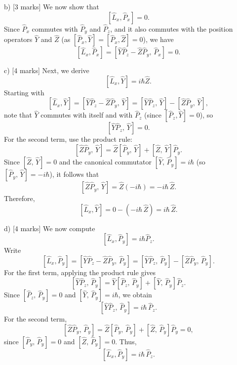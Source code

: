 \documentclass{article}
\begin{document}
b) [3 marks] 
We now show that
\[
\left[\hat{L}_x, \hat{P}_x\right] = 0.
\]
Since \(\hat{P}_x\) commutes with \(\hat{P}_y\) and \(\hat{P}_z\), and it also commutes with the position operators \(\hat{Y}\) and \(\hat{Z}\) (as \([\hat{P}_x, \hat{Y}] = [\hat{P}_x, \hat{Z}] = 0\)), we have
\[
\left[\hat{L}_x, \hat{P}_x\right] = \left[\hat{Y}\hat{P}_z - \hat{Z}\hat{P}_y,\, \hat{P}_x\right] = 0.
\]

c) [4 marks]
Next, we derive
\[
\left[\hat{L}_x, \hat{Y}\right] = i\hbar \hat{Z}.
\]
Starting with
\[
\left[\hat{L}_x, \hat{Y}\right] = \left[\hat{Y}\hat{P}_z - \hat{Z}\hat{P}_y,\, \hat{Y}\right] 
= \left[\hat{Y}\hat{P}_z,\, \hat{Y}\right] - \left[\hat{Z}\hat{P}_y,\, \hat{Y}\right],
\]
note that \(\hat{Y}\) commutes with itself and with \(\hat{P}_z\) (since \([\hat{P}_z, \hat{Y}]=0\)), so
\[
\left[\hat{Y}\hat{P}_z,\, \hat{Y}\right] = 0.
\]
For the second term, use the product rule:
\[
\left[\hat{Z}\hat{P}_y,\, \hat{Y}\right] = \hat{Z}\left[\hat{P}_y,\, \hat{Y}\right] + \left[\hat{Z},\, \hat{Y}\right]\hat{P}_y.
\]
Since \([\hat{Z},\, \hat{Y}]=0\) and the canonical commutator \([\hat{Y},\, \hat{P}_y] = i\hbar\) (so \([\hat{P}_y,\, \hat{Y}] = -i\hbar\)), it follows that
\[
\left[\hat{Z}\hat{P}_y,\, \hat{Y}\right] = \hat{Z}(-i\hbar) = -i\hbar\,\hat{Z}.
\]
Therefore,
\[
\left[\hat{L}_x, \hat{Y}\right] = 0 - \left(-i\hbar\,\hat{Z}\right) = i\hbar\,\hat{Z}.
\]

d) [4 marks]
We now compute
\[
\left[\hat{L}_x, \hat{P}_y\right] = i\hbar \hat{P}_z.
\]
Write
\[
\left[\hat{L}_x, \hat{P}_y\right] = \left[\hat{Y}\hat{P}_z - \hat{Z}\hat{P}_y,\, \hat{P}_y\right] 
= \left[\hat{Y}\hat{P}_z,\, \hat{P}_y\right] - \left[\hat{Z}\hat{P}_y,\, \hat{P}_y\right].
\]
For the first term, applying the product rule gives
\[
\left[\hat{Y}\hat{P}_z,\, \hat{P}_y\right] = \hat{Y}\left[\hat{P}_z,\, \hat{P}_y\right] + \left[\hat{Y},\, \hat{P}_y\right]\hat{P}_z.
\]
Since \([\hat{P}_z,\, \hat{P}_y]=0\) and \([\hat{Y},\, \hat{P}_y] = i\hbar\), we obtain
\[
\left[\hat{Y}\hat{P}_z,\, \hat{P}_y\right] = i\hbar\,\hat{P}_z.
\]
For the second term,
\[
\left[\hat{Z}\hat{P}_y,\, \hat{P}_y\right] = \hat{Z}\left[\hat{P}_y,\, \hat{P}_y\right] + \left[\hat{Z},\, \hat{P}_y\right]\hat{P}_y = 0,
\]
since \([\hat{P}_y,\, \hat{P}_y]=0\) and \([\hat{Z},\, \hat{P}_y]=0\). Thus,
\[
\left[\hat{L}_x, \hat{P}_y\right] = i\hbar\,\hat{P}_z.
\]
\end{document}
